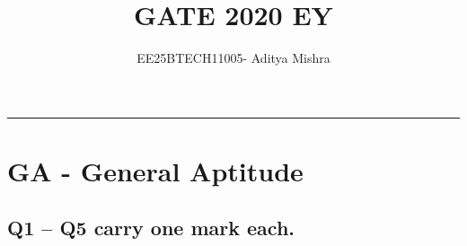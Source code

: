 




\title{GATE 2020 EY}
\author{EE25BTECH11005- Aditya Mishra}
\maketitle

\rule{\columnwidth}{0.3pt}

\section*{GA - General Aptitude}
\subsection*{Q1 -- Q5 carry one mark each.}

